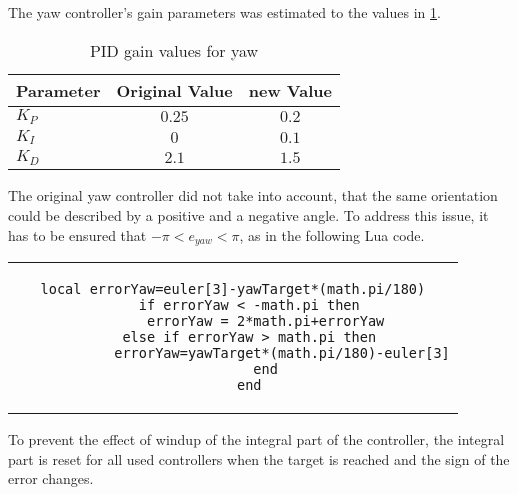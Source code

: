 The yaw controller's gain parameters was estimated to the values in \ref{tab:PIDyaw}.
\begin{table}[h]
	\centering
	\begin{tabular}{|l|c|c|}
    		\hline
		Parameter & Original Value & new Value \\
		\hline
    		$K_P$ & $0.25$ &  $0.2$\\
    		\hline
		$K_I$ & $0$ & $0.1$   \\
    		\hline
		$K_D$  & $2.1$ & $1.5$  \\
    		\hline
	\end{tabular}
    	\caption{\gls{PID} gain values for yaw}
      	\label{tab:PIDyaw}
\end{table}
The original yaw controller did not take into account, that the same orientation could be described by a positive and a negative angle.
To address this issue, it has to be ensured that $-\pi<e_{yaw}<\pi$, as in the following Lua code.
\begin{center}
\begin{tabular}{c}
\begin{lstlisting}[basicstyle=\small, language={[5.2]Lua}]
	local errorYaw=euler[3]-yawTarget*(math.pi/180)
	if errorYaw < -math.pi then
		errorYaw = 2*math.pi+errorYaw
	else if errorYaw > math.pi then
			errorYaw=yawTarget*(math.pi/180)-euler[3]
		end
	end
\end{lstlisting}

\end{tabular}
\end{center}


To prevent the effect of windup of the integral part of the controller, the integral part is reset for all used controllers when the target is reached and the sign of the error changes.






